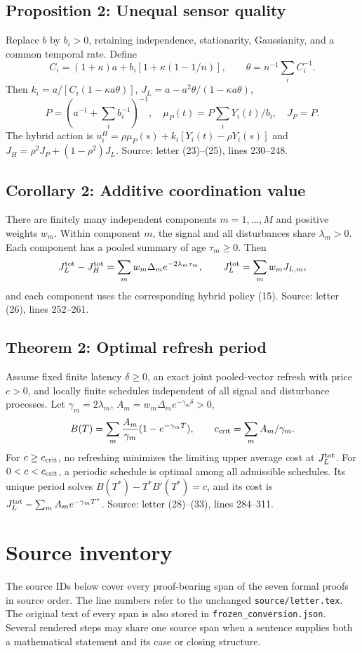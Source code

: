 \documentclass[11pt,letterpaper]{article}
\begin{document}
\subsection{Proposition 2: Unequal sensor quality}\label{contract-U}
Replace $b$ by $b_i>0$, retaining independence, stationarity, Gaussianity, and a common temporal rate. Define
\[
C_i=(1+\kappa)a+b_i[1+\kappa(1-1/n)],\qquad \theta=n^{-1}\sum_i C_i^{-1}.
\]
Then $k_i=a/[C_i(1-\kappa a\theta)]$, $J_L=a-a^2\theta/(1-\kappa a\theta)$,
\[
P=(a^{-1}+\sum_i b_i^{-1})^{-1},\quad
\mu_P(t)=P\sum_iY_i(t)/b_i,\quad J_P=P.
\]
The hybrid action is $u_i^H=\rho\mu_P(s)+k_i[Y_i(t)-\rho Y_i(s)]$ and $J_H=\rho^2J_P+(1-\rho^2)J_L$.
\noindent Source: letter (23)--(25), lines 230--248.

\subsection{Corollary 2: Additive coordination value}\label{contract-C}
There are finitely many independent components $m=1,\ldots,M$ and positive weights $w_m$. Within component $m$, the signal and all disturbances share $\lambda_m>0$. Each component has a pooled summary of age $\tau_m\ge0$. Then
\[
J_L^{\rm tot}-J_H^{\rm tot}=\sum_mw_m\Delta_m e^{-2\lambda_m\tau_m},\qquad
J_L^{\rm tot}=\sum_mw_mJ_{L,m},
\]
and each component uses the corresponding hybrid policy (15).
\noindent Source: letter (26), lines 252--261.

\subsection{Theorem 2: Optimal refresh period}\label{contract-R}
Assume fixed finite latency $\delta\ge0$, an exact joint pooled-vector refresh with price $c>0$, and locally finite schedules independent of all signal and disturbance processes. Let $\gamma_m=2\lambda_m$, $A_m=w_m\Delta_m e^{-\gamma_m\delta}>0$,
\[
B(T)=\sum_m\frac{A_m}{\gamma_m}(1-e^{-\gamma_mT}),\qquad
c_{\rm crit}=\sum_mA_m/\gamma_m.
\]
For $c\ge c_{\rm crit}$, no refreshing minimizes the limiting upper average cost at $J_L^{\rm tot}$. For $0<c<c_{\rm crit}$, a periodic schedule is optimal among all admissible schedules. Its unique period solves $B(T^*)-T^*B'(T^*)=c$, and its cost is $J_L^{\rm tot}-\sum_m A_m e^{-\gamma_mT^*}$.
\noindent Source: letter (28)--(33), lines 284--311.


\section{Source inventory}
The source IDs below cover every proof-bearing span of the seven formal proofs in source order. The line numbers refer to the unchanged \texttt{source/letter.tex}. The original text of every span is also stored in \texttt{frozen\_conversion.json}. Several rendered steps may share one source span when a sentence supplies both a mathematical statement and its case or closing structure.
\end{document}
